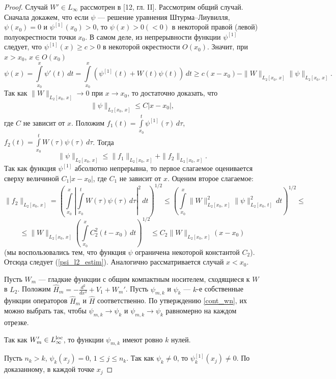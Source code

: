 \documentclass[a4paper
]{article}
\begin{document}
\begin{proof}
Случай $W'\in L_\infty$ рассмотрен в [12, гл. II]. Рассмотрим общий случай.
Сначала докажем, что если $\psi$ --- решение уравнения Штурма--Лиувилля,
$\psi(x_0)=0$ и $\psi^{[1]}(x_0)>0$, то $\psi(x)>0(<0)$ в некоторой
правой (левой) полуокрестности точки $x_0$. В самом деле, из непрерывности
функции $\psi^{[1]}$ следует, что $\psi^{[1]}(x)\ge c>0$ в некоторой
окрестности $O(x_0)$. Значит, при $x>x_0$, $x\in O(x_0)$
$$\psi(x)=\int \limits_{x_0}^x\psi'(t)\, dt=\int \limits_{x_0}^x
\left(\psi^{[1]}(t)+W(t)\psi(t)\right)\, dt\ge c(x-x_0)-\|W\|_{L_2[x_0,
\, x]}\|\psi\|_{L_2[x_0, \, x]}.$$ Так как $\|W\|_{L_2[x_0, \, x]}
\rightarrow 0$ при $x\rightarrow x_0$, то достаточно доказать, что
\begin{align}
\label{psi_l2_estim}
\|\psi\|_{L_2[x_0, \, x]}\le C|x-x_0|,
\end{align}
где $C$ не зависит от $x$. Положим $f_1(t)=\int \limits_{x_0}^t
\psi^{[1]}(\tau)\, d\tau$, $f_2(t)=\int \limits_{x_0}^t W(\tau)\psi
(\tau)\, d\tau$. Тогда $$\|\psi\|_{L_2[x_0, \, x]}\le \|f_1\|
_{L_2[x_0, \, x]}+\|f_2\|_{L_2[x_0, \, x]}.$$ Так как функция $\psi^{[1]}$
абсолютно непрерывна, то первое слагаемое оценивается сверху
величиной $C_1|x-x_0|$, где $C_1$ не зависит от $x$. Оценим второе слагаемое:
$$\|f_2\|_{L_2[x_0, \, x]}=\left(\int \limits_{x_0}^x\left|
\int \limits_{x_0}^t W(\tau)\psi(\tau)\, d\tau\right|^2\, dt\right)^{1/2}
\le \left(\int \limits_{x_0}^x\|W\|^2_{L_2[x_0, \, x]}\|\psi\|
_{L_2[x_0, \, t]}^2\, dt\right)^{1/2}\le $$ $$\le \|W\|_{L_2[x_0, \, x]}
\left(\int \limits_{x_0}^xC_2^2(t-x_0)\, dt\right)^{1/2}\le
C_2\|W\|_{L_2[x_0, \, x]}(x-x_0)$$ (мы воспользовались тем, что
функция $\psi$ ограничена некоторой константой $C_2$). Отсюда следует
(\ref{psi_l2_estim}). Аналогично рассматривается случай $x<x_0$. \par
Пусть $W_m$ --- гладкие функции с общим компактным носителем, сходящиеся
к $W$ в $L_2$. Положим $\hat H_m=-\frac{d^2}{dx^2}+V_1+W_m'$. Пусть
$\psi_{m,k}$ и $\psi_k$ --- $k$-е собственные функции операторов $\hat H_m$
и $\hat H$ соответственно. По утверждению \ref{cont_wn}, их можно
выбрать так, чтобы $\psi_{m,k}\rightarrow \psi_k$ и $\psi_{m,k}
\rightarrow \psi_k$ равномерно на каждом отрезке. \par
Так как $W'_m\in L_\infty^{{\rm loc}}$, то функции $\psi_{m,k}$ имеют
ровно $k$ нулей. \par
Пусть $n_k>k$, $\psi_k(x_j)=0$, $1\le j\le n_k$. Так как $\psi_k
\ne 0$, то $\psi_k^{[1]}(x_j)\ne 0$. По доказанному, в каждой точке $x_j$

\end{proof}
\end{document}
